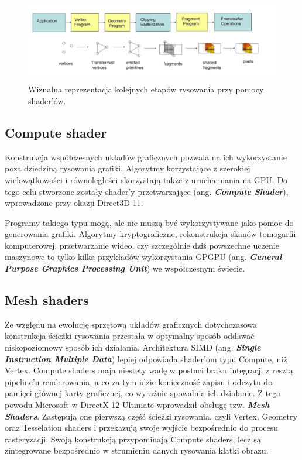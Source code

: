 \begin{figure}[htbp] %
	\centering
	\includegraphics[width=5.34091in,height=1.48711in]{images/19_shader_pipeline.png}
	\caption{Wizualna reprezentacja kolejnych etapów rysowania przy pomocy shader'ów. \cite{researchgate:openglpipeline:2024}}
	\label{fig:shader_pipeline} %
\end{figure}

\subsection{Compute shader}
Konstrukcja współczesnych układów graficznych pozwala na ich
wykorzystanie poza dziedziną rysowania grafiki. Algorytmy korzystające z
szerokiej wielowątkowości i równoległości skorzystają także z
uruchamiania na GPU. Do tego celu stworzone zostały shader'y
przetwarzające (ang. \emph{\textbf{Compute Shader}}), wprowadzone przy
okazji Direct3D 11.

Programy takiego typu mogą, ale nie muszą być wykorzystywane jako pomoc
do generowania grafiki. Algorytmy kryptograficzne, rekonstrukcja skanów
tomogarfii komputerowej, przetwarzanie wideo, czy szczególnie dziś
powszechne uczenie maszynowe to tylko kilka przykładów wykorzystania
GPGPU (ang. \emph{\textbf{General Purpose Graphics Processing Unit}}) we
współczesnym świecie.

\subsection{Mesh shaders}
Ze względu na ewolucję sprzętową układów graficznych dotychczasowa
konstrukcja ścieżki rysowania przestała w optymalny sposób oddawać
niskopoziomowy sposób ich działania. Architektura SIMD (ang.
\emph{\textbf{Single Instruction Multiple Data}}) lepiej odpowiada
shader'om typu Compute, niż Vertex. Compute shaders mają niestety wadę w
postaci braku integracji z resztą pipeline'u renderowania, a co za tym
idzie konieczność zapisu i odczytu do pamięci głównej karty graficznej,
co wyraźnie spowalnia ich działanie. Z tego powodu Microsoft w DirectX 12 Ultimate wprowadził obsługę tzw.
\emph{\textbf{Mesh Shaders}}. Zastępują one pierwszą część ścieżki
rysowania, czyli Vertex, Geometry oraz Tesselation shaders i przekazują
swoje wyjście bezpośrednio do procesu rasteryzacji. Swoją konstrukcją
przypominają Compute shaders, lecz są zintegrowane bezpośrednio w
strumieniu danych rysowania klatki obrazu.

